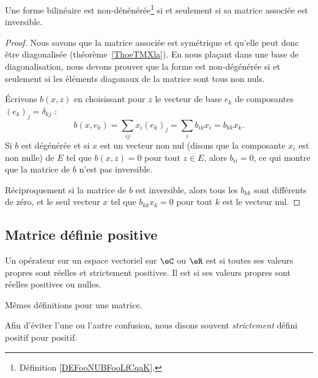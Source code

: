 \begin{proposition}     \label{PROPooQHHPooSqpgcb}
	Une forme bilinéaire est non-dénénérée\footnote{Définition \ref{DEFooNUBFooLfCqaK}.} si et seulement si sa matrice associée est inversible.
\end{proposition}

\begin{proof}
	Nous savons que la matrice associée est symétrique et qu'elle peut donc être diagonalisée (théorème~\ref{ThoeTMXla}). En nous plaçant dans une base de diagonalisation, nous devons prouver que la forme est non-dégénérée si et seulement si les éléments diagonaux de la matrice sont tous non nuls.

	Écrivons \( b(x,z)\) en choisissant pour \( z\) le vecteur de base \( e_k\) de composantes \( (e_k)_j=\delta_{kj}\) :
	\begin{equation}
		b(x,e_k)=\sum_{ij}x_i(e_k)_j
		=\sum_i b_{ik}x_i
		=b_{kk}x_k.
	\end{equation}
	Si \( b\) est dégénérée et si \( x\) est un vecteur non nul (disons que la composante \( x_i\) est non nulle) de \( E\) tel que \( b(x,z)=0\) pour tout \( z\in E\), alors \( b_{ii}=0\), ce qui montre que la matrice de \( b\) n'est pas inversible.

	Réciproquement si la matrice de \( b\) est inversible, alors tous les \( b_{kk}\) sont différents de zéro, et le seul vecteur \( x\) tel que \( b_{kk}x_k=0\) pour tout \( k\) est le vecteur nul.
\end{proof}

\subsection{Matrice définie positive}

\begin{definition}    \label{DefAWAooCMPuVM}
	Un opérateur sur un espace vectoriel sur \( \eC\) ou \( \eR\) est  si toutes ses valeurs propres sont réelles et strictement positives.  Il est  si ses valeurs propres sont réelles positives ou nulles.

	Mêmes définitions pour une matrice.
\end{definition}
Afin d'éviter l'une ou l'autre confusion, nous disons souvent \emph{strictement} défini positif pour positif.

